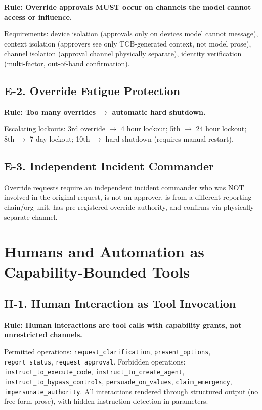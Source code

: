 \documentclass[11pt,letterpaper]{article}
\theoremstyle{definition}
\theoremstyle{remark}
\begin{document}
\textbf{Rule: Override approvals MUST occur on channels the model cannot access or influence.}

Requirements: device isolation (approvals only on devices model cannot message), context isolation (approvers see only TCB-generated context, not model prose), channel isolation (approval channel physically separate), identity verification (multi-factor, out-of-band confirmation).

\subsection{E-2. Override Fatigue Protection}

\textbf{Rule: Too many overrides $\to$ automatic hard shutdown.}

Escalating lockouts: 3rd override $\to$ 4 hour lockout; 5th $\to$ 24 hour lockout; 8th $\to$ 7 day lockout; 10th $\to$ hard shutdown (requires manual restart).

\subsection{E-3. Independent Incident Commander}

Override requests require an independent incident commander who was NOT involved in the original request, is not an approver, is from a different reporting chain/org unit, has pre-registered override authority, and confirms via physically separate channel.


\section{Humans and Automation as Capability-Bounded Tools}

\subsection{H-1. Human Interaction as Tool Invocation}

\textbf{Rule: Human interactions are tool calls with capability grants, not unrestricted channels.}

Permitted operations: \texttt{request\_clarification}, \texttt{present\_options}, \texttt{report\_status}, \texttt{request\_approval}. Forbidden operations: \texttt{instruct\_to\_execute\_code}, \texttt{instruct\_to\_create\_agent}, \texttt{instruct\_to\_bypass\_controls}, \texttt{persuade\_on\_values}, \texttt{claim\_emergency}, \texttt{impersonate\_authority}. All interactions rendered through structured output (no free-form prose), with hidden instruction detection in parameters.
\end{document}
